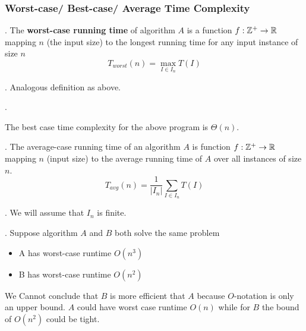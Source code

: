 \documentclass{article}
\begin{document}
\subsubsection{Worst-case/ Best-case/ Average Time Complexity}

\begin{deff}.
    The \textbf{worst-case running time} of algorithm $A$ is a function $f : {\mathbb{Z}}^+ \to {\mathbb{R}}$ mapping $n$ (the input size) to the longest running time for any input instance of size $n$ 
    \[ T_{worst}(n) = \max_{I \in I_n} T(I) \] 
\end{deff}

\begin{deff}.
    Analogous definition as above. 
\end{deff}

\begin{examplee}[].
    \begin{algorithm}[H] 
    \end{algorithm}
    The best case time complexity for the above program is $\Theta(n)$. 
\end{examplee}

\begin{center}
\end{center}

\begin{deff}.
    The average-case running  time of an algorithm $A$ is function $f : {\mathbb{Z}}^+ \to {\mathbb{R}}$ mapping $n$ (input  size) to the average running time of $A$ over all instances of size $n$. 
    \[ T_{avg}(n) = \frac{1}{|I_n|} \sum_{I \in I_n} T(I) \]
\end{deff}

\begin{comm}[].
    We will assume that $I_n$ is finite. 
\end{comm}

\begin{discovery}[].
    Suppose algorithm $A$ and $B$ both solve the same problem 
    \begin{itemize}
        \item A  has worst-case runtime $O(n^3)$
        \item B  has worst-case runtime $O(n^2)$
    \end{itemize}  
    We Cannot conclude that $B$ is more efficient that $A$ because $O$-notation is only an upper bound. $A$ could have worst case runtime $O(n)$ while for $B$ the bound of $O(n^2)$ could be tight. 
\end{discovery}
\end{document}
